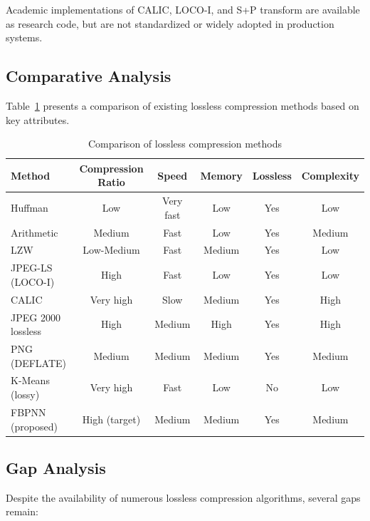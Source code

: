 Academic implementations of CALIC, LOCO-I, and S+P transform are available as research code, but are not standardized or widely adopted in production systems.

\subsection{Comparative Analysis}

Table~\ref{tab:comparison} presents a comparison of existing lossless compression methods based on key attributes.

\begin{table}[H]
\centering
\caption{Comparison of lossless compression methods}
\label{tab:comparison}
\small
\begin{tabularx}{\textwidth}{|>{\raggedright\arraybackslash}X|c|c|c|c|c|}
\hline
\textbf{Method} & \textbf{Compression Ratio} & \textbf{Speed} & \textbf{Memory} & \textbf{Lossless} & \textbf{Complexity} \\
\hline
Huffman & Low & Very fast & Low & Yes & Low \\
\hline
Arithmetic & Medium & Fast & Low & Yes & Medium \\
\hline
LZW & Low-Medium & Fast & Medium & Yes & Low \\
\hline
JPEG-LS (LOCO-I) & High & Fast & Low & Yes & Low \\
\hline
CALIC & Very high & Slow & Medium & Yes & High \\
\hline
JPEG 2000 lossless & High & Medium & High & Yes & High \\
\hline
PNG (DEFLATE) & Medium & Medium & Medium & Yes & Medium \\
\hline
K-Means (lossy) & Very high & Fast & Low & No & Low \\
\hline
FBPNN (proposed) & High (target) & Medium & Medium & Yes & Medium \\
\hline
\end{tabularx}
\end{table}

\subsection{Gap Analysis}

Despite the availability of numerous lossless compression algorithms, several gaps remain:

